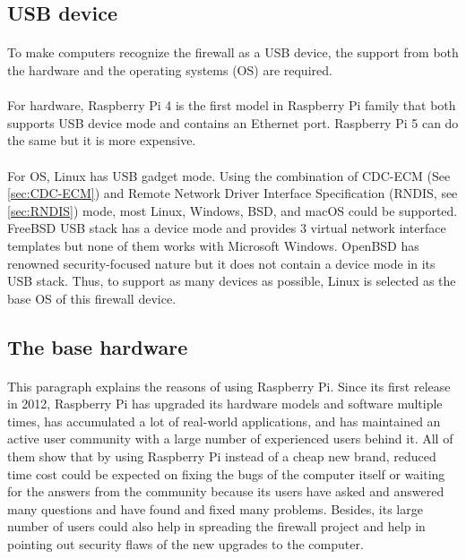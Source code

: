 \documentclass[mscthesis]{usiinfthesis}
\begin{document}
\subsection{USB device}
\paragraph{}
To make computers recognize the firewall as a USB device, the support from both the hardware and the operating systems (OS) are required.
\paragraph{}
For hardware, Raspberry Pi 4 is the first model in Raspberry Pi family that both supports USB device mode and contains an Ethernet port. Raspberry Pi 5 can do the same but it is more expensive.
\paragraph{}
For OS, Linux has USB gadget mode. Using the combination of CDC-ECM (See \cref{sec:CDC-ECM}) and Remote Network Driver Interface Specification (RNDIS, see \cref{sec:RNDIS}) mode, most Linux, Windows, BSD, and macOS could be supported. FreeBSD USB stack has a device mode and provides 3 virtual network interface templates but none of them works with Microsoft Windows\citep{freebsdhb:usb}. OpenBSD has renowned security-focused nature but it does not contain a device mode in its USB stack. Thus, to support as many devices as possible, Linux is selected as the base OS of this firewall device.

\subsection{The base hardware}
\paragraph{}
This paragraph explains the reasons of using Raspberry Pi. Since its first release in 2012, Raspberry Pi has upgraded its hardware models and software multiple times, has accumulated a lot of real-world applications, and has maintained an active user community with a large number of experienced users behind it. All of them show that by using Raspberry Pi instead of a cheap new brand, reduced time cost could be expected on fixing the bugs of the computer itself or waiting for the answers from the community because its users have asked and answered many questions and have found and fixed many problems. Besides, its large number of users could also help in spreading the firewall project and help in pointing out security flaws of the new upgrades to the computer.
\end{document}
